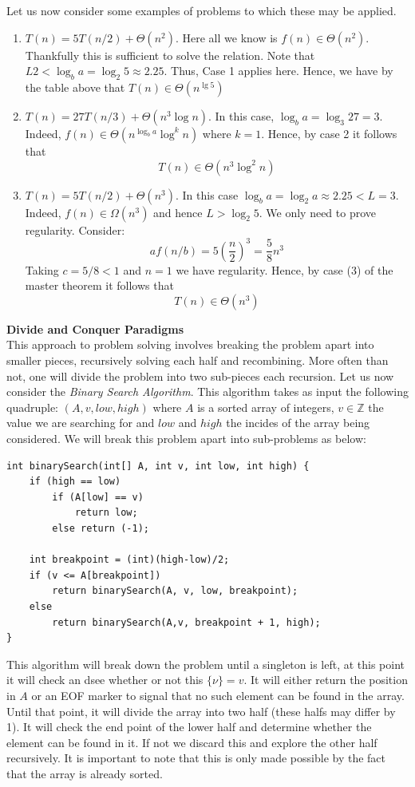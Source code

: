 \documentclass[9pt]{article} %
\newcommand{\ZZ}{\mathbb{Z}} %
\newcounter{problem}[section]
\begin{document}
	Let us now consider some examples of problems to which these may be applied.
	\begin{enumerate}
		\item $T(n) = 5T(n/2) + \Theta(n^2)$. Here all we know is $f(n) \in \Theta(n^2)$. Thankfully this is sufficient to solve the relation. Note that $L 2 < \log_b{a} = \log_2{5} \approx 2.25$. Thus, Case 1 applies here. Hence, we have by the table above that $T(n) \in \Theta(n^{\lg{5}})$
		
		\item $T(n) = 27 T(n/3) + \Theta(n^3\log{n})$. In this case, $\log_b{a} = \log_3{27} = 3$. Indeed, $f(n) \in \Theta(n^{\log_b{a}}\log^k{n})$ where $k = 1$. Hence, by case 2 it follows that 
		$$ T(n) \in \Theta(n^3\log^2{n})$$
		
		\item $T(n) = 5T(n/2) + \Theta(n^3)$. In this case $\log_b{a} = \log_2{a} \approx 2.25 < L = 3$. Indeed, $f(n) \in \Omega(n^3)$ and hence $L > \log_2{5}$. We only need to prove regularity. Consider:
		$$ af(n/b) = 5\left(\frac{n}{2}\right)^3 =  \frac{5}{8} n^3 $$
		Taking $c = 5/8 < 1$ and $n = 1$ we have regularity. Hence, by case (3) of the master theorem it follows that
		$$ T(n) \in \Theta(n^3) $$
	\end{enumerate}
	
	\noindent \textbf{Divide and Conquer Paradigms} \\
	
	This approach to problem solving involves breaking the problem apart into smaller pieces, recursively solving each half and recombining. More often than not, one will divide the problem into two sub-pieces each recursion. Let us now consider the \emph{Binary Search Algorithm}. This algorithm takes as input the following quadruple: $(A, v, low, high)$ where $A$ is a sorted array of integers, $v \in \ZZ$ the value we are searching for and $low$ and $high$ the incides of the array being considered. We will break this problem apart into sub-problems as below:
	\begin{lstlisting}
int binarySearch(int[] A, int v, int low, int high) {
	if (high == low)
		if (A[low] == v)
			return low;
		else return (-1);
	
	int breakpoint = (int)(high-low)/2;
	if (v <= A[breakpoint])
		return binarySearch(A, v, low, breakpoint);
	else
		return binarySearch(A,v, breakpoint + 1, high);
}
	\end{lstlisting}
	This algorithm will break down the problem until a singleton is left, at this point it will check an dsee whether or not this $\{\nu\} = v$. It will either return the position in $A$ or an EOF marker to signal that no such element can be found in the array. Until that point, it will divide the array into two half (these halfs may differ by 1). It will check the end point of the lower half and determine whether the element can be found in it. If not we discard this and explore the other half recursively. It is important to note that this is only made possible by the fact that the array is already sorted. \\
	
\end{document}
